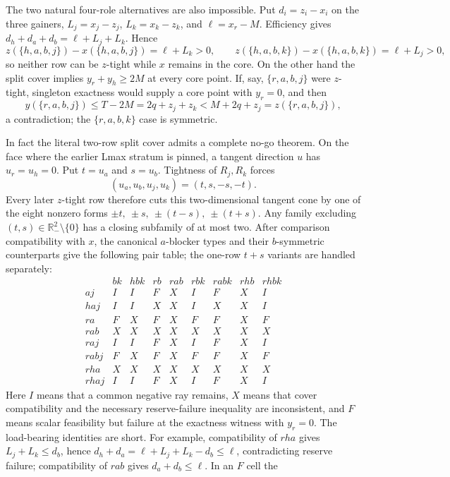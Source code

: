 \documentclass[11pt]{article}
\begin{document}
The two natural four-role alternatives are also impossible.  Put
$d_i=z_i-x_i$ on the three gainers, $L_j=x_j-z_j$, $L_k=x_k-z_k$, and
$\ell=x_r-M$.  Efficiency gives
$d_h+d_a+d_b=\ell+L_j+L_k$.  Hence
\[
 z(\{h,a,b,j\})-x(\{h,a,b,j\})=\ell+L_k>0,
 \qquad z(\{h,a,b,k\})-x(\{h,a,b,k\})=\ell+L_j>0,
\]
so neither row can be $z$-tight while $x$ remains in the core.  On the other
hand the split cover implies $y_r+y_h\ge2M$ at every core point.  If, say,
$\{r,a,b,j\}$ were $z$-tight, singleton exactness would supply a core point
with $y_r=0$, and then
\[
 y(\{r,a,b,j\})\le T-2M=2q+z_j+z_k
        < M+2q+z_j=z(\{r,a,b,j\}),
\]
a contradiction; the $\{r,a,b,k\}$ case is symmetric.

In fact the literal two-row split cover admits a complete no-go theorem.
On the face where the earlier Lmax stratum is pinned, a tangent direction
$u$ has $u_r=u_h=0$.  Put $t=u_a$ and $s=u_b$.  Tightness of $R_j,R_k$
forces
\[
 (u_a,u_b,u_j,u_k)=(t,s,-s,-t).
\]
Every later $z$-tight row therefore cuts this two-dimensional tangent cone
by one of the eight nonzero forms
\(
 \pm t,\ \pm s,\ \pm(t-s),\ \pm(t+s).
\)
Any family excluding $(t,s)\in\mathbb R_-^2\setminus\{0\}$ has a closing
subfamily of at most two.  After comparison compatibility with $x$, the
canonical $a$-blocker types and their $b$-symmetric counterparts give the
following pair table; the one-row $t+s$ variants are handled separately:
\[
\begin{array}{c|cccccccc}
 &bk&hbk&rb&rab&rbk&rabk&rhb&rhbk\\ \hline
aj   &I&I&F&X&I&F&X&I\\
haj  &I&I&X&X&I&X&X&I\\
ra   &F&X&F&X&F&F&X&F\\
rab  &X&X&X&X&X&X&X&X\\
raj  &I&I&F&X&I&F&X&I\\
rabj &F&X&F&X&F&F&X&F\\
rha  &X&X&X&X&X&X&X&X\\
rhaj &I&I&F&X&I&F&X&I
\end{array}                                             \tag{PXC93}
\]
Here $I$ means that a common negative ray remains, $X$ means that cover
compatibility and the necessary reserve-failure inequality are inconsistent,
and $F$ means scalar feasibility but failure at the exactness witness with
$y_r=0$.  The load-bearing identities are short.  For example, compatibility
of $rha$ gives $L_j+L_k\le d_b$, hence
$d_h+d_a=\ell+L_j+L_k-d_b\le\ell$, contradicting reserve failure;
compatibility of $rab$ gives $d_a+d_b\le\ell$.  In an $F$ cell the
\end{document}

